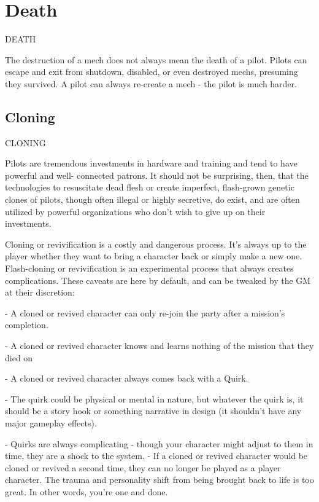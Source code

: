 \section{Death}
  DEATH  

The destruction of a mech does not always mean the death of a pilot. Pilots can escape and exit  
from shutdown, disabled, or even destroyed mechs, presuming they survived. A pilot can always  
re-create a mech - the pilot is much harder.
 
\subsection{Cloning}
                                                  CLONING  

Pilots are tremendous investments in hardware and training and tend to have powerful and well- 
connected patrons. It should not be surprising, then, that the technologies to resuscitate dead  
flesh or create imperfect, flash-grown genetic clones of pilots, though often illegal or highly  
secretive, do exist, and are often utilized by powerful organizations who don’t wish to give up on  
their investments.
 

Cloning or revivification is a costly and dangerous process. It’s always up to the player whether  
they want to bring a character back or simply make a new one. Flash-cloning or revivification  
is an experimental process that always creates complications. These caveats are here by  
default, and can be tweaked by the GM at their discretion:
 

    -    A cloned or revived character can only re-join the party after a mission’s completion.
 
    -    A cloned or revived character knows and learns nothing of the mission that they died on
 
    -    A cloned or revived character always comes back with a Quirk. 
 
             -   The quirk could be physical or mental in nature, but whatever the quirk is, it  
                 should be a story hook or something narrative in design (it shouldn’t have any  
                 major gameplay effects). 
 
             -   Quirks are always complicating - though your character might adjust to them in  
                 time, they are a shock to the system.  
    -    If a cloned or revived character would be cloned or revived a second time, they can no  
         longer be played as a player character. The trauma and personality shift from being  
         brought back to life is too great. In other words, you’re one and done.
 

